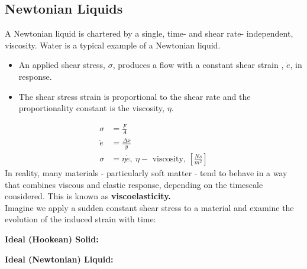 \documentclass[a4paper, 11pt, normalem]{report}
\begin{document}
\subsection{Newtonian Liquids}
A Newtonian liquid is chartered by a single, time- and shear rate- independent, viscosity.
Water is a typical example of a Newtonian liquid.
\begin{itemize}
    \item An applied shear stress, $\sigma$, produces a flow with a constant shear strain , $\dot{e}$, in response.
    \item The shear stress strain is proportional to the shear rate and the proportionality constant is the viscosity, $\eta$.
\end{itemize}
\begin{align}
    \sigma &= \frac FA \\
    \dot{e} &= \frac{\Delta\dot{x}}{y} \\
    \sigma &= \eta\dot{e},~ \eta - \text{ viscosity, } \left[\frac{Ns}{m^2}\right]
\end{align}
In reality, many materials - particularly soft matter - tend to behave in a way that combines viscous and elastic response, depending on the timescale considered.
This is known as \textbf{viscoelasticity.}\\
Imagine we apply a sudden constant shear stress to a material and examine the evolution of the induced strain with time:
\begin{multicols}{2}
    \begin{center}
    \textbf{Ideal (Hookean) Solid:}
    \begin{figure}[H]
        \centering
    \end{figure}
    \end{center}
    \columnbreak
    \begin{center}
    \textbf{Ideal (Newtonian) Liquid:}
    \begin{figure}[H]
        \centering
    \end{figure}
    \end{center}
\end{multicols}
\end{document}
